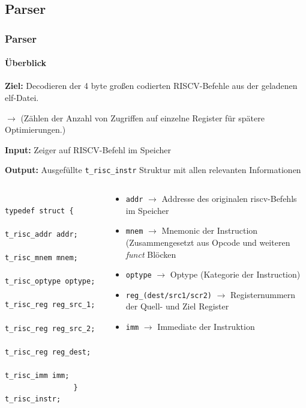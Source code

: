 \documentclass[german]{tum-presentation}
\newcommand{\refer}[0]{\ensuremath{\rightarrow} }
\begin{document}
\subsection{Parser} %
\begin{frame}[fragile]
	\frametitle{Parser}
	\framesubtitle{Überblick}
	\textbf{Ziel:} Decodieren der 4 byte großen codierten RISCV-Befehle aus der geladenen elf-Datei.

	\refer (Zählen der Anzahl von Zugriffen auf einzelne Register für spätere Optimierungen.)

	\vspace{0.25cm}
	\textbf{Input:} Zeiger auf RISCV-Befehl im Speicher

	\textbf{Output:} Ausgefüllte \verb!t_risc_instr! Struktur mit allen relevanten Informationen
	
	\pause

	\begin{columns}
		\begin{column}{0.4\textwidth}
			\begin{lstlisting}
				typedef struct {
				    t_risc_addr addr;
				    t_risc_mnem mnem;
				    t_risc_optype optype;
				    t_risc_reg reg_src_1;
				    t_risc_reg reg_src_2;
				    t_risc_reg reg_dest;
				    t_risc_imm imm;
				} t_risc_instr;
			\end{lstlisting}
		\end{column}
		\begin{column}{0.6\textwidth}
			\vspace{0.25cm}
			\begin{itemize}
				\item \verb!addr! \refer Addresse des originalen riscv-Befehls im Speicher				
				\item \verb!mnem! \refer Mnemonic der Instruction (Zusammengesetzt aus Opcode und weiteren \textit{funct} Blöcken
				\item \verb!optype! \refer Optype (Kategorie der Instruction)
				\item \verb!reg_(dest/src1/scr2)! \refer Registernummern der Quell- und Ziel Register
				\item \verb!imm! \refer Immediate der Instruktion
			\end{itemize}
		\end{column}
	\end{columns}


\end{frame}
\end{document}
